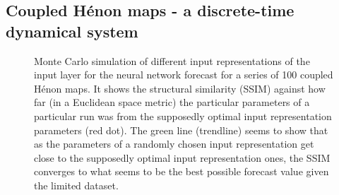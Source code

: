 \documentclass[journal]{IEEEtran}
\begin{document}
%
%


\subsection{Coupled H\'{e}non maps - a discrete-time dynamical system}

\begin{figure}[!htb]
\centering
{}
\caption{Monte Carlo simulation of different  input representations of the input layer for the neural network forecast for a series of 100 coupled
H\'{e}non maps.
It shows the structural similarity (SSIM) against how far (in a Euclidean space metric) the particular parameters of a particular
run was from the supposedly optimal input representation parameters (red dot). The green line (trendline) seems to show that as the parameters
of a randomly chosen input representation get close to the supposedly optimal input representation ones, the SSIM converges to what seems to be the
best possible forecast value given the limited dataset.}
\label{MonteCarloSSIMversusParameterMetricDistance100HenonCoupledMaps}
\end{figure}
\end{document}
